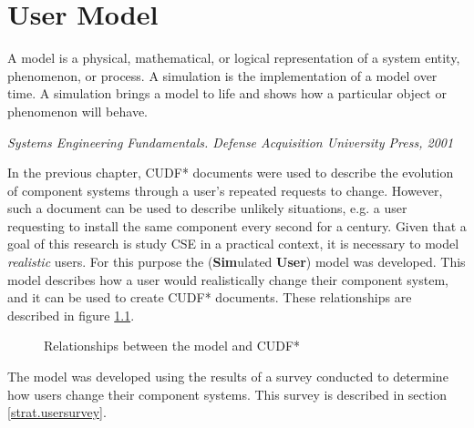 \chapter{User Model}
\label{simulation}
\epigraph{A model is a physical, mathematical, or logical representation of a system entity, phenomenon, or process. 
A simulation is the implementation of a model over time. 
A simulation brings a model to life and shows how a particular object or phenomenon will behave.}
{\textit{Systems Engineering Fundamentals. Defense Acquisition University Press, 2001}}

In the previous chapter, CUDF* documents were used to describe the evolution of component systems through a user's repeated requests to change.
However, such a document can be used to describe unlikely situations,
e.g. a user requesting to install the same component every second for a century.
Given that a goal of this research is study CSE in a practical context,
it is necessary to model \textit{realistic} users. 
For this purpose the \usermodel (\textbf{Sim}ulated \textbf{User}) model was developed.
This model describes how a user would realistically change their component system,
and it can be used to create CUDF* documents.
These relationships are described in figure \ref{sim.modeldiagram}.

\begin{figure}[htp]
\begin{center}
  \caption{Relationships between the \usermodel model and CUDF*}
  \label{sim.modeldiagram}
\end{center}
\end{figure}

The \usermodel model was developed using the results of a survey conducted to determine how users change their component systems.
This survey is described in section \ref{strat.usersurvey}.

